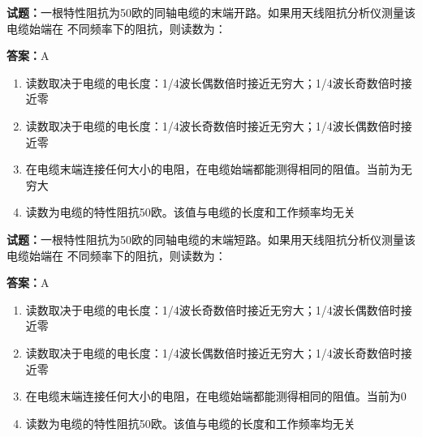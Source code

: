 \documentclass{ctexbook}
\begin{document}





\vspace{1em}

\textbf{试题：}一根特性阻抗为50欧的同轴电缆的末端开路。如果用天线阻抗分析仪测量该电缆始端在
不同频率下的阻抗，则读数为： 

\textbf{答案：}A 

\begin{enumerate}[leftmargin=3em]
  \item 读数取决于电缆的电长度：1/4波长偶数倍时接近无穷大；1/4波长奇数倍时接近零 

  \item 读数取决于电缆的电长度：1/4波长奇数倍时接近无穷大；1/4波长偶数倍时接近零 

  \item 在电缆末端连接任何大小的电阻，在电缆始端都能测得相同的阻值。当前为无穷大 

  \item 读数为电缆的特性阻抗50欧。该值与电缆的长度和工作频率均无关 

\end{enumerate}





\vspace{1em}

\textbf{试题：}一根特性阻抗为50欧的同轴电缆的末端短路。如果用天线阻抗分析仪测量该电缆始端在
不同频率下的阻抗，则读数为： 

\textbf{答案：}A 

\begin{enumerate}[leftmargin=3em]
  \item 读数取决于电缆的电长度：1/4波长奇数倍时接近无穷大；1/4波长偶数倍时接近零 

  \item 读数取决于电缆的电长度：1/4波长偶数倍时接近无穷大；1/4波长奇数倍时接近零 

  \item 在电缆末端连接任何大小的电阻，在电缆始端都能测得相同的阻值。当前为0 

  \item 读数为电缆的特性阻抗50欧。该值与电缆的长度和工作频率均无关 

\end{enumerate}

\end{document}
